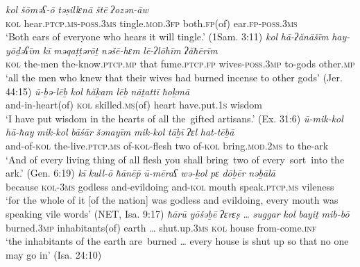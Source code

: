 \documentclass[output=paper]{langsci/langscibook}
\begin{document}
\ea%
    \label{ex:doron:51}
    \ea
    \gll \textit{kol}   \textit{šōməʕ-ō}    \textit{təṣillɛnā}             \textit{štē}               \textit{ʔozən-āw}\\
         \textsc{kol} hear.\textsc{ptcp.ms-poss.3ms}  tingle.\textsc{mod.3fp}  both.\textsc{fp}(of)  ear.\textsc{fp-poss.3ms}  \\
    \glt `Both ears of everyone who hears it will tingle.' (1Sam. 3:11)
    \ex
    \gll \textit{kol}   \textit{hā-ʔănāšīm}   \textit{hay-yōḏəʕīm}          \textit{kī}      \textit{məqaṭṭərōṯ}      \textit{nəšē-hɛm}             \textit{lē-ʔlōhīm}  \textit{ʔăħērīm}\\
         \textsc{kol} the-men the-know.\textsc{ptcp.mp} that  fume.\textsc{ptcp.fp}   wives-\textsc{poss.3mp}  to-gods     other\textsc{.mp}\\
    \glt `all the men who knew that their wives had burned incense to other gods' (Jer. 44:15)
    \ex
    \gll \textit{ū-ḇə{}-lēḇ}              \textit{kol}   \textit{ħăḵam}             \textit{lēḇ}       \textit{nāṯattī}           \textit{ħoḵmā}\\
         and-in-heart(of) \textsc{kol} skilled.\textsc{ms}(of) heart   have.put.\textsc{1s}  wisdom\\
    \glt `I have put wisdom in the hearts of all the~gifted artisans.' (Ex. 31:6)
    \ex
    \gll \textit{ū-mik-kol}    \textit{hā-ħay}     {\textit{mik-kol} \textit{bāśār}} \textit{šənayīm} \textit{mik-kol}   \textit{tāḇī} \textit{ʔɛl} \textit{hat-tēḇā}\\
         and-of-\textsc{kol} the-live.\textsc{ptcp.ms} of-\textsc{kol-}flesh   two        of-\textsc{kol}    bring.\textsc{mod.2ms} to the-ark\\
    \glt `And of every living thing of all flesh you shall bring~two of every~sort~into the ark.' (Gen. 6:19)
    \ex
    \gll \textit{kī}            \textit{kull-ō}      \textit{ħānē\={p}}    \textit{ū-mēraʕ}          \textit{wə-ḵol}     \textit{pɛ}          \textit{dōḇēr}                \textit{nəḇālā}\\
         because  \textsc{kol-3ms} godless and-evildoing  and-\textsc{kol} mouth  speak.\textsc{ptcp.ms}  vileness\\
    \glt `for the whole of it [of the nation] was godless and evildoing, every mouth was speaking vile words' (NET, Isa. 9:17)
    \ex
    \gll \textit{ħārū}             \textit{yōšəḇē}             \textit{ʔɛrɛṣ} \textit{…}  \textit{suggar}           \textit{kol}   \textit{bayiṯ}     \textit{mib-bō}\\
         burned.\textsc{3mp}  inhabitants(of) earth …  shut.up.\textsc{3ms}   \textsc{kol}  house  from-come.\textsc{inf}\\
    \glt `the inhabitants of the earth are~burned … every house is shut up so that no one may go in' (Isa. 24:10)
    \z
\z
\end{document}
